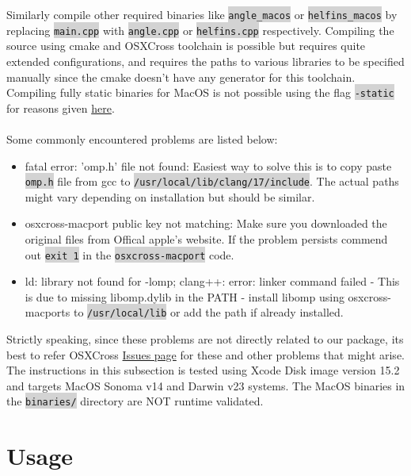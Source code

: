 \documentclass[11pt]{article}
\newcommand{\inlinecode}[1]{\colorbox{lightgray}{\lstinline[breaklines=true,basicstyle=\ttfamily]{#1}}}
\begin{document}
Similarly compile other required binaries like \inlinecode{angle_macos} or \inlinecode{helfins_macos} by replacing \inlinecode{main.cpp} with \inlinecode{angle.cpp} or \inlinecode{helfins.cpp} respectively. Compiling the source using cmake and OSXCross toolchain is possible but requires quite extended configurations, and requires the paths to various libraries to be specified manually since the cmake doesn't have any generator for this toolchain. Compiling fully static binaries for MacOS is not possible using the flag \inlinecode{-static} for reasons given \href{https://stackoverflow.com/questions/3801011/ld-library-not-found-for-lcrt0-o-on-osx-10-6-with-gcc-clang-static-flag}{here}. \\\\
Some commonly encountered problems are listed below:
\begin{itemize}
    \item fatal error: 'omp.h' file not found: Easiest way to solve this is to copy paste \inlinecode{omp.h} file from gcc to \inlinecode{/usr/local/lib/clang/17/include}. The actual paths might vary depending on installation but should be similar.
    \item osxcross-macport public key not matching: Make sure you downloaded the original files from Offical apple's website. If the problem persists commend out \inlinecode{exit 1} in the \inlinecode{osxcross-macport} code.
    \item ld: library not found for -lomp; clang++: error: linker command failed - This is due to missing libomp.dylib in the PATH - install libomp using osxcross-macports  to \inlinecode{/usr/local/lib} or add the path if already installed.
\end{itemize}
Strictly speaking, since these problems are not directly related to our package, its best to refer OSXCross \href{https://github.com/tpoechtrager/osxcross/issues}{Issues page} for these and other problems that might arise.\\

The instructions in this subsection is tested using Xcode Disk image version 15.2 and targets MacOS Sonoma v14 and Darwin v23 systems. The MacOS binaries in the \inlinecode{binaries/} directory are NOT runtime validated.

\section{Usage}
\end{document}
